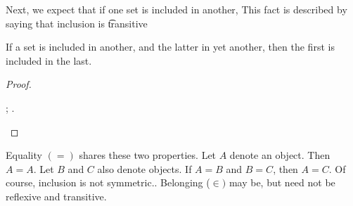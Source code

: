 Next, we expect that if one set is included in another,
This fact is described by saying that inclusion is \t{transitive}
\begin{proposition}[Transitive]
  If a set is included in another, and the latter in yet another, then the first is included in the last.
\end{proposition}
\begin{proof}
\begin{caccount}
  ;
  .
\end{caccount}
\end{proof}

Equality $(=)$ shares these two properties.
Let $A$ denote an object.
Then $A = A$.
Let $B$ and $C$ also denote objects.
If $A = B$ and $B = C$, then $A = C$.
Of course, inclusion is not symmetric..
Belonging ($\in)$ may be, but need not be reflexive and transitive.


%
